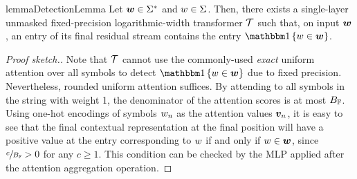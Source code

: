 \begin{restatable}{lemma}{DetectionLemma} \label{lem:detection}
   Let ${{\boldsymbol{w}}} \in {{{{{{\Sigma}}^{*}}}}}$ and ${{w}} \in {{\Sigma}}$. 
   Then, there exists a single-layer unmasked fixed-precision logarithmic-width transformer ${{\mathcal{T}}}$ such that, on input ${{\boldsymbol{w}}}$, an entry of its final residual stream contains the entry $\ind{\sym \in \str}$.
\end{restatable}
\begin{proof}[Proof sketch.]
   Note that ${{\mathcal{T}}}$ cannot use the commonly-used \emph{exact} uniform attention over all symbols to detect $\ind{\sym \in \str}$ due to fixed precision.
   Nevertheless, rounded uniform attention suffices. 
   By attending to all symbols in the string with weight 1, the denominator of the attention scores is at most ${{B_{{{\mathbb{F}}}}}}$.
   Using one-hot encodings of symbols ${{w}}_{{n}}$ as the attention values ${{{\bm{v}}}}_{{n}}$, it is easy to see that the final contextual representation at the final position will have a positive value at the entry corresponding to ${{w}}$ if and only if ${{w}} \in {{\boldsymbol{w}}}$, since $\sfrac{c}{{{B_{{{\mathbb{F}}}}}}} > 0$ for any $c \geq 1$.
   This condition can be checked by the MLP applied after the attention aggregation operation.   
\end{proof}

